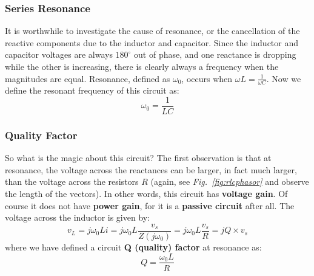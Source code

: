 \subsubsection{Series Resonance}
It is worthwhile to investigate the cause of resonance, or the cancellation of the reactive components due to the inductor and capacitor.  Since the inductor and capacitor voltages are always $180^\circ$ out of phase, and one reactance is dropping while the other is increasing, there is clearly always a frequency when the magnitudes are equal.  Resonance, defined as $\omega_0$, occurs when $\omega L = \frac{1}{\omega C}$.  Now we define the resonant frequency of this circuit as:
    \begin{equation}
        \omega_0 = \frac{1}{LC}
    \end{equation}
\subsubsection{Quality Factor}
So what is the magic about this circuit?  The first observation is that at resonance, the voltage across the reactances can be larger, in fact much larger, than the voltage across the resistors $R$ (again, see \emph{Fig.~\ref{fig:rlcphasor}} and observe the length of the vectors).  In other words, this circuit has \textbf{voltage gain}.  Of course it does not have \textbf{power gain}, for it is a \textbf{passive circuit} after all.  The voltage across the inductor is given by:
    \begin{equation}
        v_L = j\omega_0 L i = j\omega_0 L \frac{v_s}{Z(j\omega_0)} =  j\omega_0 L \frac{v_s}{R} = j Q \times v_s
    \end{equation}
where we have defined a circuit \textbf{Q (quality) factor} at resonance as:
    \begin{equation}
        Q = \frac{\omega_0 L}{R}
    \end{equation}
